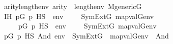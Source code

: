 \begin{isabellebody}
\ \ \ \ {\isachardoublequoteopen}arity{\isacharparenleft}{\kern0pt}{\isasymphi}{\isacharparenright}{\kern0pt}{\isasymle}length{\isacharparenleft}{\kern0pt}env{\isacharparenright}{\kern0pt}{\isachardoublequoteclose}\ {\isachardoublequoteopen}arity{\isacharparenleft}{\kern0pt}{\isasympsi}{\isacharparenright}{\kern0pt}\ {\isasymle}\ length{\isacharparenleft}{\kern0pt}env{\isacharparenright}{\kern0pt}{\isachardoublequoteclose}\ {\isachardoublequoteopen}M{\isacharunderscore}{\kern0pt}generic{\isacharparenleft}{\kern0pt}G{\isacharparenright}{\kern0pt}{\isachardoublequoteclose}\isanewline
\ \ \ \ \isanewline
\ \ \ \ IH{\isacharcolon}{\kern0pt}\ {\isachardoublequoteopen}{\isacharparenleft}{\kern0pt}{\isasymexists}p{\isasymin}G{\isachardot}{\kern0pt}\ p\ {\isasymtturnstile}HS\ {\isasymphi}\ env{\isacharparenright}{\kern0pt}\ \ {\isasymlongleftrightarrow}\ \ \ SymExt{\isacharparenleft}{\kern0pt}G{\isacharparenright}{\kern0pt}{\isacharcomma}{\kern0pt}\ map{\isacharparenleft}{\kern0pt}val{\isacharparenleft}{\kern0pt}G{\isacharparenright}{\kern0pt}{\isacharcomma}{\kern0pt}env{\isacharparenright}{\kern0pt}\ {\isasymTurnstile}\ {\isasymphi}{\isachardoublequoteclose}\isanewline
\ \ \ \ \ \ \ \ {\isachardoublequoteopen}{\isacharparenleft}{\kern0pt}{\isasymexists}p{\isasymin}G{\isachardot}{\kern0pt}\ p\ {\isasymtturnstile}HS\ {\isasympsi}\ env{\isacharparenright}{\kern0pt}\ \ {\isasymlongleftrightarrow}\ \ \ SymExt{\isacharparenleft}{\kern0pt}G{\isacharparenright}{\kern0pt}{\isacharcomma}{\kern0pt}\ map{\isacharparenleft}{\kern0pt}val{\isacharparenleft}{\kern0pt}G{\isacharparenright}{\kern0pt}{\isacharcomma}{\kern0pt}env{\isacharparenright}{\kern0pt}\ {\isasymTurnstile}\ {\isasympsi}{\isachardoublequoteclose}\isanewline
\ \ \isanewline
\ \ \ \ {\isachardoublequoteopen}{\isacharparenleft}{\kern0pt}{\isasymexists}p{\isasymin}G{\isachardot}{\kern0pt}\ {\isacharparenleft}{\kern0pt}p\ {\isasymtturnstile}HS\ And{\isacharparenleft}{\kern0pt}{\isasymphi}{\isacharcomma}{\kern0pt}{\isasympsi}{\isacharparenright}{\kern0pt}\ env{\isacharparenright}{\kern0pt}{\isacharparenright}{\kern0pt}\ {\isasymlongleftrightarrow}\ SymExt{\isacharparenleft}{\kern0pt}G{\isacharparenright}{\kern0pt}\ {\isacharcomma}{\kern0pt}\ map{\isacharparenleft}{\kern0pt}val{\isacharparenleft}{\kern0pt}G{\isacharparenright}{\kern0pt}{\isacharcomma}{\kern0pt}env{\isacharparenright}{\kern0pt}\ {\isasymTurnstile}\ And{\isacharparenleft}{\kern0pt}{\isasymphi}{\isacharcomma}{\kern0pt}{\isasympsi}{\isacharparenright}{\kern0pt}{\isachardoublequoteclose}\isanewline
%
\isadelimproof
\ \isanewline

\end{isabellebody}
